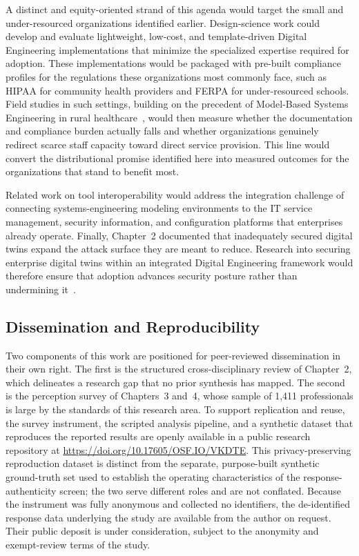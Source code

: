 A distinct and equity-oriented strand of this agenda would target the small and under-resourced organizations identified earlier. Design-science work could develop and evaluate lightweight, low-cost, and template-driven Digital Engineering implementations that minimize the specialized expertise required for adoption. These implementations would be packaged with pre-built compliance profiles for the regulations these organizations most commonly face, such as HIPAA for community health providers and FERPA for under-resourced schools. Field studies in such settings, building on the precedent of Model-Based Systems Engineering in rural healthcare~\parencite{Berg_2023}, would then measure whether the documentation and compliance burden actually falls and whether organizations genuinely redirect scarce staff capacity toward direct service provision. This line would convert the distributional promise identified here into measured outcomes for the organizations that stand to benefit most.

Related work on tool interoperability would address the integration challenge of connecting systems-engineering modeling environments to the IT service management, security information, and configuration platforms that enterprises already operate. Finally, Chapter~2 documented that inadequately secured digital twins expand the attack surface they are meant to reduce. Research into securing enterprise digital twins within an integrated Digital Engineering framework would therefore ensure that adoption advances security posture rather than undermining it~\parencite{Suhail_Iqbal_Jurdak_2024}.

\subsection{Dissemination and Reproducibility}

Two components of this work are positioned for peer-reviewed dissemination in their own right. The first is the structured cross-disciplinary review of Chapter~2, which delineates a research gap that no prior synthesis has mapped. The second is the perception survey of Chapters~3 and~4, whose sample of 1{,}411 professionals is large by the standards of this research area. To support replication and reuse, the survey instrument, the scripted analysis pipeline, and a synthetic dataset that reproduces the reported results are openly available in a public research repository at \url{https://doi.org/10.17605/OSF.IO/VKDTE}. This privacy-preserving reproduction dataset is distinct from the separate, purpose-built synthetic ground-truth set used to establish the operating characteristics of the response-authenticity screen; the two serve different roles and are not conflated. Because the instrument was fully anonymous and collected no identifiers, the de-identified response data underlying the study are available from the author on request. Their public deposit is under consideration, subject to the anonymity and exempt-review terms of the study.

